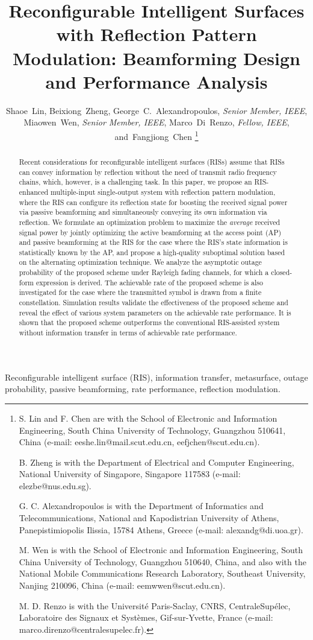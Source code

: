 \documentclass[draftclsnofoot,onecolumn,12pt]{IEEEtran}
\title{Reconfigurable Intelligent Surfaces with Reflection Pattern Modulation: 
		Beamforming Design and Performance Analysis}
\author{Shaoe~Lin, Beixiong~Zheng, George~C.~Alexandropoulos, {\it Senior Member, IEEE},\\
	Miaowen~Wen, {\it Senior Member, IEEE}, Marco~Di~Renzo, {\it Fellow, IEEE}, and~Fangjiong~Chen
	\thanks{
		
		S. Lin and F. Chen are with the School of Electronic and Information Engineering, South China University of Technology, Guangzhou 510641, China (e-mail: eeshe.lin@mail.scut.edu.cn, eefjchen@scut.edu.cn).
		
		B. Zheng is with the Department of Electrical and Computer Engineering, National University of Singapore,  Singapore 117583 (e-mail: elezbe@nus.edu.sg).
		
		G. C. Alexandropoulos is with the Department of Informatics and Telecommunications, National and Kapodistrian University of Athens, Panepistimiopolis Ilissia, 15784 Athens, Greece (e-mail: alexandg@di.uoa.gr). 
		
		M. Wen is with the School of Electronic and Information Engineering,
		South China University of Technology, Guangzhou 510640, China, and also
		with the National Mobile Communications Research Laboratory, Southeast
		University, Nanjing 210096, China (e-mail: eemwwen@scut.edu.cn).
		
		M. D. Renzo is with the Université Paris-Saclay, CNRS, CentraleSupélec, Laboratoire des Signaux et 
		Systèmes, Gif-sur-Yvette, France
		(e-mail: marco.direnzo@centralesupelec.fr).
}
}
\begin{document}
\maketitle

\begin{abstract}

Recent considerations for reconfigurable intelligent surfaces (RISs) assume that RISs can convey information by reflection without the need of transmit radio frequency chains, which, however, is a challenging task. 
In this paper, we propose an RIS-enhanced multiple-input single-output system with reflection pattern modulation, where the RIS can configure its reflection state for boosting the received signal power via passive beamforming and simultaneously conveying its own information via reflection. 
We formulate an optimization problem to maximize the {\it average} received signal power by jointly optimizing the active beamforming at the access point (AP) and passive beamforming at the RIS for the case where the RIS’s state information is statistically known by the AP, and propose a high-quality suboptimal solution based on the alternating optimization technique.
	We analyze the asymptotic outage probability of the proposed scheme under Rayleigh fading channels, for which a closed-form expression is derived.
	The achievable rate of the proposed scheme is also investigated for the case where the transmitted symbol is drawn from a finite constellation. 
	Simulation results validate the effectiveness of the proposed scheme and reveal the effect of various system parameters on the achievable rate performance.
	It is shown that the proposed scheme outperforms the conventional RIS-assisted system without information transfer in terms of achievable rate performance.  

\end{abstract}
\begin{IEEEkeywords}
	Reconfigurable intelligent surface (RIS), information transfer, metasurface, outage probability, passive beamforming, rate performance, reflection modulation.
\end{IEEEkeywords}
\IEEEpeerreviewmaketitle
\end{document}
